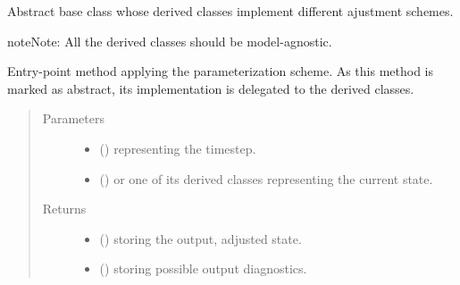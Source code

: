 \documentclass[letterpaper,10pt,english]{sphinxmanual}
\begin{document}
\begin{fulllineitems}
\label{\detokenize{api:parameterizations.adjustment.Adjustment}}
Abstract base class whose derived classes implement different ajustment schemes.

\begin{sphinxadmonition}{note}{Note:}
All the derived classes should be model-agnostic.
\end{sphinxadmonition}

\begin{fulllineitems}
\label{\detokenize{api:parameterizations.adjustment.Adjustment.__call__}}
Entry-point method applying the parameterization scheme.
As this method is marked as abstract, its implementation is delegated to the derived classes.
\begin{quote}\begin{description}
\item[{Parameters}] \leavevmode\begin{itemize}
\item {} 
 () \textendash{}  representing the timestep.

\item {} 
 () \textendash{} {\hyperref[\detokenize{api:storages.grid_data.GridData}]{}} or one of its derived classes representing the current state.

\end{itemize}

\item[{Returns}] \leavevmode
\begin{itemize}
\item {} 
 () \textendash{} {\hyperref[\detokenize{api:storages.grid_data.GridData}]{}} storing the output, adjusted state.

\item {} 
 () \textendash{} {\hyperref[\detokenize{api:storages.grid_data.GridData}]{}} storing possible output diagnostics.


\end{itemize}
\end{description}
\end{quote}
\end{fulllineitems}
\end{fulllineitems}
\end{document}
